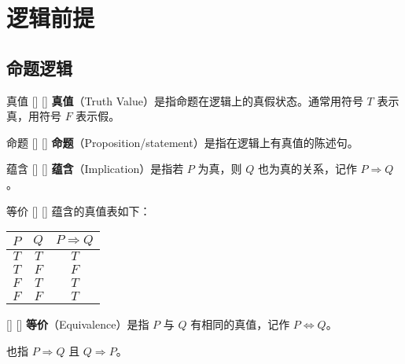 \documentclass[UTF8]{ctexart}
\begin{document}
\tableofcontents
\newpage

\section{逻辑前提}

    \subsection{命题逻辑}

        \begin{dfn}
            []
            {真值}
            []
            []
            \textbf{真值}（Truth Value）是指命题在逻辑上的真假状态。通常用符号 $T$ 表示真，用符号 $F$ 表示假。
        \end{dfn}



        \begin{dfn}
            []
            {命题}
            []
            []
            \textbf{命题}（Proposition/statement）是指在逻辑上有真值的陈述句。
        \end{dfn}

        \begin{dfn}
            []
            {蕴含}
            []
            []
            \textbf{蕴含}（Implication）是指若 $P$ 为真，则 $Q$ 也为真的关系，记作 $P \Rightarrow Q$。
        \end{dfn}

        \begin{ppt}
            []
            {等价}
            []
            []
            蕴含的真值表如下：
            \begin{center}
                \begin{tabular}{c|c|c}
                    $P$ & $Q$ & $P \Rightarrow Q$ \\
                    \hline
                    $T$ & $T$ & $T$ \\
                    $T$ & $F$ & $F$ \\
                    $F$ & $T$ & $T$ \\
                    $F$ & $F$ & $T$ \\
                \end{tabular}
            \end{center}
        \end{ppt}



        \begin{dfn}
            []
            {}
            []
            []
            \textbf{等价}（Equivalence）是指 $P$ 与 $Q$ 有相同的真值，记作 $P \Leftrightarrow Q$。

            也指 $P \Rightarrow Q$ 且 $Q \Rightarrow P$。
       \end{dfn}
\end{document}
